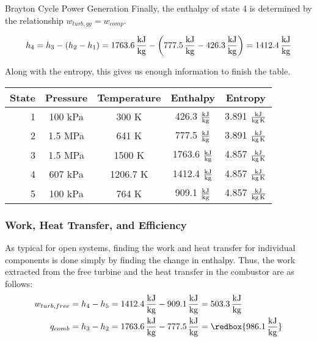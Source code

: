 \begin{example}[label=ex:turboshaft]{Brayton Cycle Power Generation}
  Finally, the enthalpy of state 4 is determined by the relationship $w_{turb, gg} = w_{comp}$.
  
  \begin{equation*}
    h_4 = h_3 - (h_2 - h_1) =  1763.6\, \frac{\rm kJ}{\rm kg} - \left(777.5\, \frac{\rm kJ}{\rm kg} - 426.3\, \frac{\rm kJ}{\rm kg}\right) = 1412.4\, \frac{\rm kJ}{\rm kg}
  \end{equation*}
  
  Along with the entropy, this gives us enough information to finish the table.
  
  \begin{table}[H]
    \centering
    \def\arraystretch{1.5}
    \begin{tabular}{r|cccc}
      State & Pressure & Temperature & Enthalpy & Entropy \\ \hline
      1 & 100 kPa & 300 K & 426.3 $\frac{\rm kJ}{\rm kg}$ & 3.891 $\frac{\rm kJ}{\rm kg\, K}$ \\
      2 & 1.5 MPa & 641 K & 777.5 $\frac{\rm kJ}{\rm kg}$ & 3.891 $\frac{\rm kJ}{\rm kg\, K}$ \\
      3 & 1.5 MPa & 1500 K & 1763.6 $\frac{\rm kJ}{\rm kg}$ & 4.857 $\frac{\rm kJ}{\rm kg\, K}$ \\
      4 &  {\color{Red} 607 kPa} &  {\color{Red} 1206.7 K} &  {\color{Red} 1412.4 $\frac{\rm kJ}{\rm kg}$}  & 4.857 $\frac{\rm kJ}{\rm kg\, K}$ \\
      5 & 100 kPa & 764 K & 909.1 $\frac{\rm kJ}{\rm kg}$ & 4.857 $\frac{\rm kJ}{\rm kg\, K}$
    \end{tabular}
    \def\arraystretch{1.0}
  \end{table}
  
  \subsubsection*{Work, Heat Transfer, and Efficiency}
  As typical for open systems, finding the work and heat transfer for individual components is done simply by finding the change in enthalpy.  Thus, the work extracted from the free turbine and the heat transfer in the combustor are as follows:
  \begin{align*}
    w_{turb, free} &= h_4 - h_5 = 1412.4\, \frac{\rm kJ}{\rm kg} - 909.1\, \frac{\rm kJ}{\rm kg} = 503.3\, \frac{\rm kJ}{\rm kg} \\
    q_{comb} &= h_3 - h_2 = 1763.6\, \frac{\rm kJ}{\rm kg} - 777.5\, \frac{\rm kJ}{\rm kg} = \redbox{986.1\, \frac{\rm kJ}{\rm kg}}
  \end{align*}


\end{example}
